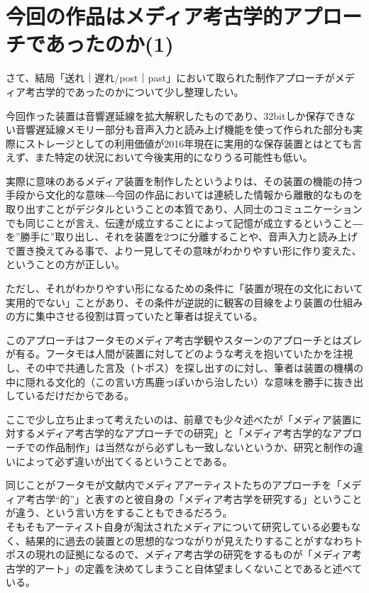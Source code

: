\section{今回の作品はメディア考古学的アプローチであったのか(1)}\label{ux4ecaux56deux306eux4f5cux54c1ux306fux30e1ux30c7ux30a3ux30a2ux8003ux53e4ux5b66ux7684ux30a2ux30d7ux30edux30fcux30c1ux3067ux3042ux3063ux305fux306eux304b1}

さて、結局「送れ｜遅れ/post｜past」において取られた制作アプローチがメディア考古学的であったのかについて少し整理したい。

今回作った装置は音響遅延線を拡大解釈したものであり、32bitしか保存できない音響遅延線メモリー部分も音声入力と読み上げ機能を使って作られた部分も実際にストレージとしての利用価値が2016年現在に実用的な保存装置とはとても言えず、また特定の状況において今後実用的になりうる可能性も低い。

実際に意味のあるメディア装置を制作したというよりは、その装置の機能の持つ手段から文化的な意味―今回の作品においては連続した情報から離散的なものを取り出すことがデジタルということの本質であり、人同士のコミュニケーションでも同じことが言え、伝達が成立することによって記憶が成立するということ―を''勝手に''取り出し、それを装置を2つに分離することや、音声入力と読み上げで置き換えてみる事で、より一見してその意味がわかりやすい形に作り変えた、ということの方が正しい。

ただし、それがわかりやすい形になるための条件に「装置が現在の文化において実用的でない」ことがあり、その条件が逆説的に観客の目線をより装置の仕組みの方に集中させる役割は買っていたと筆者は捉えている。

このアプローチはフータモのメディア考古学観やスターンのアプローチとはズレが有る。フータモは人間が装置に対してどのような考えを抱いていたかを注視し、その中で共通した言及（トポス）を探し出すのに対し、筆者は装置の機構の中に隠れる文化的（この言い方馬鹿っぽいから治したい）な意味を勝手に抜き出しているだけだからである。

ここで少し立ち止まって考えたいのは、前章でも少々述べたが「メディア装置に対するメディア考古学的なアプローチでの研究」と「メディア考古学的なアプローチでの作品制作」は当然ながら必ずしも一致しないというか、研究と制作の違いによって必ず違いが出てくるということである。

同じことがフータモが文献内でメディアアーティストたちのアプローチを「メディア考古学``的''」と表すのと彼自身の「メディア考古学を研究する」ということが違う、という言い方をすることもできるだろう。\\
そもそもアーティスト自身が淘汰されたメディアについて研究している必要もなく、結果的に過去の装置との思想的なつながりが見えたりすることがすなわちトポスの現れの証拠になるので、メディア考古学の研究をするものが「メディア考古学的アート」の定義を決めてしまうこと自体望ましくないことであると述べている。

